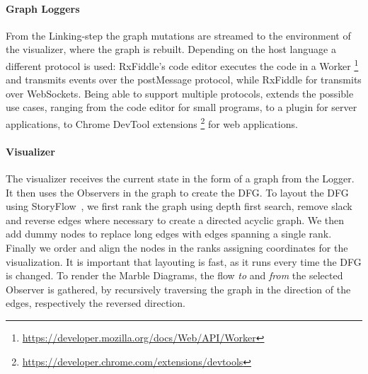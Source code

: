 \paragraph{Graph Loggers} From the Linking-step the graph mutations are
streamed to the environment of the visualizer, where the graph is
rebuilt.  Depending on the host language a different protocol is used:
RxFiddle's code editor executes the code in a Worker%
\footnote{\url{https://developer.mozilla.org/docs/Web/API/Worker}} and
transmits events over the postMessage protocol, while RxFiddle for
\NodeJS{} transmits over WebSockets.  Being able to support multiple
protocols, extends the possible use cases, ranging from the code editor
for small programs, to a \NodeJS{} plugin for server applications, to
Chrome DevTool extensions%
\footnote{\url{https://developer.chrome.com/extensions/devtools}} for
web applications.

\vspace{-1mm}
\paragraph{Visualizer} The visualizer receives the current state in the
form of a graph from the Logger.  It then uses the Observers in the
graph to create the DFG.  To layout the DFG using StoryFlow~\cite{liu2013storyflow},
we first rank the graph using depth first search, remove 
slack~\cite{gansner1993technique} and
reverse edges where necessary to create a directed acyclic graph.  We
then add dummy nodes to replace long edges with edges spanning a single
rank.  Finally we order and align the nodes in the ranks assigning
coordinates for the visualization.  It is important that layouting is fast,
as it runs every time the DFG is changed.  To render the Marble Diagrams,
the flow \emph{to} and \emph{from} the selected Observer is gathered, by recursively
traversing the graph in the direction of the edges, respectively the
reversed direction.